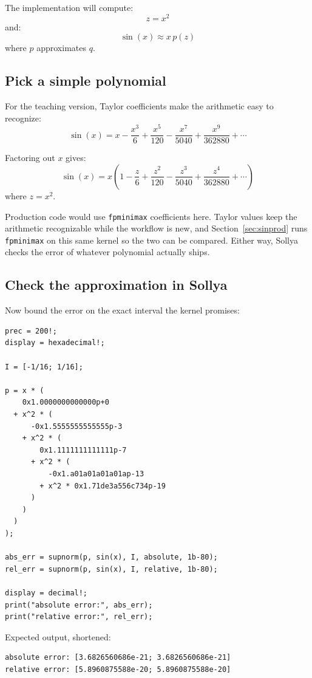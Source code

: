 \documentclass[manuscript, nonacm]{acmart}
\begin{document}
    The implementation will compute:
    \[
        z = x^2
    \]
    and:
    \[
        \sin(x) \approx x\,p(z)
    \]
    where $p$ approximates $q$.

    \subsection{Pick a simple polynomial}

    For the teaching version, Taylor coefficients make the arithmetic easy to
    recognize:
    \[
        \sin(x) = x - \frac{x^3}{6} + \frac{x^5}{120} - \frac{x^7}{5040} +
        \frac{x^9}{362880} + \cdots
    \]

    Factoring out $x$ gives:
    \[
        \sin(x) = x\!\left(1 - \frac{z}{6} + \frac{z^2}{120} - \frac{z^3}{5040} +
                         \frac{z^4}{362880} + \cdots\right)
    \]
    where $z = x^2$.

    Production code would use \texttt{fpminimax} coefficients here. Taylor values
    keep the arithmetic recognizable while the workflow is new, and
    Section~\ref{sec:sinprod} runs \texttt{fpminimax} on this same kernel so the two
    can be compared. Either way, Sollya checks the error of whatever polynomial
    actually ships.

    \subsection{Check the approximation in Sollya}

    Now bound the error on the exact interval the kernel promises:
    \begin{lstlisting}[style=sollya]
prec = 200!;
display = hexadecimal!;

I = [-1/16; 1/16];

p = x * (
    0x1.0000000000000p+0
  + x^2 * (
      -0x1.5555555555555p-3
    + x^2 * (
        0x1.1111111111111p-7
      + x^2 * (
          -0x1.a01a01a01a01ap-13
        + x^2 * 0x1.71de3a556c734p-19
      )
    )
  )
);

abs_err = supnorm(p, sin(x), I, absolute, 1b-80);
rel_err = supnorm(p, sin(x), I, relative, 1b-80);

display = decimal!;
print("absolute error:", abs_err);
print("relative error:", rel_err);
    \end{lstlisting}

    Expected output, shortened:

    \begin{lstlisting}[style=output]
absolute error: [3.6826560686e-21; 3.6826560686e-21]
relative error: [5.8960875588e-20; 5.8960875588e-20]
    \end{lstlisting}
\end{document}
